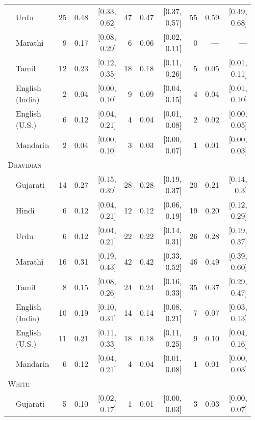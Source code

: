 \begin{table}[H]
\begin{footnotesize}
\begin{tabular}{p{.1in}lrrrrrrrrr}
 & Urdu & 25 & 0.48 & [0.33, 0.62] & 47 & 0.47 & [0.37, 0.57] & 55 & 0.59 & [0.49, 0.68]\\

 & Marathi & 9 & 0.17 & [0.08, 0.29] & 6 & 0.06 & [0.02, 0.11] & 0 & --- & ---\\

 & Tamil & 12 & 0.23 & [0.12, 0.35] & 18 & 0.18 & [0.11, 0.26] & 5 & 0.05 & [0.01, 0.11]\\

 & English (India) & 2 & 0.04 & [0.00, 0.10] & 9 & 0.09 & [0.04, 0.15] & 4 & 0.04 & [0.01, 0.10]\\

 & English (U.S.) & 6 & 0.12 & [0.04, 0.21] & 4 & 0.04 & [0.01, 0.08] & 2 & 0.02 & [0.00, 0.05]\\

& Mandarin & 2 & 0.04 & [0.00, 0.10] & 3 & 0.03 & [0.00, 0.07] & 1 & 0.01 & [0.00, 0.03]\\
\midrule
\multicolumn{11}{l}{\textsc{Dravidian}}\\
& Gujarati & 14 & 0.27 & [0.15, 0.39] & 28 & 0.28 & [0.19, 0.37] & 20 & 0.21 & [0.14, 0.3]\\

 & Hindi & 6 & 0.12 & [0.04, 0.21] & 12 & 0.12 & [0.06, 0.19] & 19 & 0.20 & [0.12, 0.29]\\

 & Urdu & 6 & 0.12 & [0.04, 0.21] & 22 & 0.22 & [0.14, 0.31] & 26 & 0.28 & [0.19, 0.37]\\

 & Marathi & 16 & 0.31 & [0.19, 0.43] & 42 & 0.42 & [0.33, 0.52] & 46 & 0.49 & [0.39, 0.60]\\

 & Tamil & 8 & 0.15 & [0.08, 0.26] & 24 & 0.24 & [0.16, 0.33] & 35 & 0.37 & [0.29, 0.47]\\

 & English (India) & 10 & 0.19 & [0.10, 0.31] & 14 & 0.14 & [0.08, 0.21] & 7 & 0.07 & [0.03, 0.13]\\

 & English (U.S.) & 11 & 0.21 & [0.11, 0.33] & 18 & 0.18 & [0.11, 0.25] & 9 & 0.10 & [0.04, 0.16]\\

& Mandarin & 6 & 0.12 & [0.04, 0.21] & 4 & 0.04 & [0.01, 0.08] & 1 & 0.01 & [0.00, 0.03]\\
\midrule
\multicolumn{11}{l}{\textsc{White}}\\
 & Gujarati & 5 & 0.10 & [0.02, 0.17] & 1 & 0.01 & [0.00, 0.03] & 3 & 0.03 & [0.00, 0.07]\\


\end{tabular}
\end{footnotesize}
\end{table}
